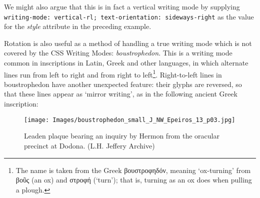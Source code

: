 We might also argue that this is in fact a vertical writing mode by supplying \texttt{writing-mode: vertical-rl; text-orientation: sideways-right} as the value for the {\itshape style} attribute in the preceding example.\par
Rotation is also useful as a method of handling a true writing mode which is not covered by the CSS Writing Modes: \textit{boustrophedon}. This is a writing mode common in inscriptions in Latin, Greek and other languages, in which alternate lines run from left to right and from right to left\footnote{The name is taken from the Greek βουστροφηδόν, meaning ‘ox-turning’ from βοῦς (an ox) and στροφή (‘turn’); that is, turning as an ox does when pulling a plough.}. Right-to-left lines in boustrophedon have another unexpected feature: their glyphs are reversed, so that these lines appear as ‘mirror writing’, as in the following ancient Greek inscription: \begin{figure}[htbp]
\noindent\noindent\texttt{[image: Images/boustrophedon\_small\_J\_NW\_Epeiros\_13\_p03.jpg]}
\caption{Leaden plaque bearing an inquiry by Hermon from the oracular precinct at Dodona. (L.H. Jeffery Archive)}\end{figure}
\par
